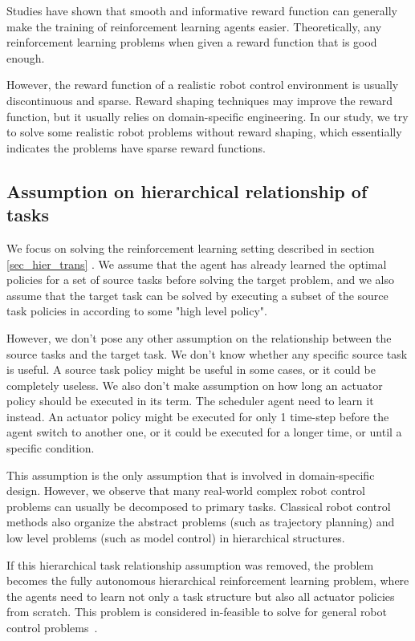 Studies have shown that smooth and informative reward function can generally make the training of reinforcement learning agents easier. Theoretically, any reinforcement learning problems when given a reward function that is good enough.

However, the reward function of a realistic robot control environment is usually discontinuous and sparse. Reward shaping techniques may improve the reward function, but it usually relies on domain-specific engineering. In our study, we try to solve some realistic robot problems without reward shaping, which essentially indicates the problems have sparse reward functions.


\subsection{Assumption on hierarchical relationship of tasks}
We focus on solving the reinforcement learning setting described in section \ref{sec_hier_trans} . We assume that the agent has already learned the optimal policies for a set of source tasks before solving the target problem, and we also assume that the target task can be solved by executing a subset of the source task policies in according to some "high level policy".

However, we don't pose any other assumption on the relationship between the source tasks and the target task. We don't know whether any specific source task is useful. A source task policy might be useful in some cases, or it could be completely useless. 
We also don't make assumption on how long an actuator policy should be executed in its term. The scheduler agent need to learn it instead. An actuator policy might be executed for only 1 time-step before the agent switch to another one, or it could be executed for a longer time, or until a specific condition.

This assumption is the only assumption that is involved in domain-specific design. However, we observe that many real-world complex robot control problems can usually be decomposed to primary tasks. Classical robot control methods also organize the abstract problems (such as trajectory planning) and low level problems (such as model control) in hierarchical structures.

If this hierarchical task relationship assumption was removed, the problem becomes the fully autonomous hierarchical reinforcement learning problem, where the agents need to learn not only a task structure but also all actuator policies from scratch. This problem is considered in-feasible to solve for general robot control problems~\cite{barto2003recent}.


